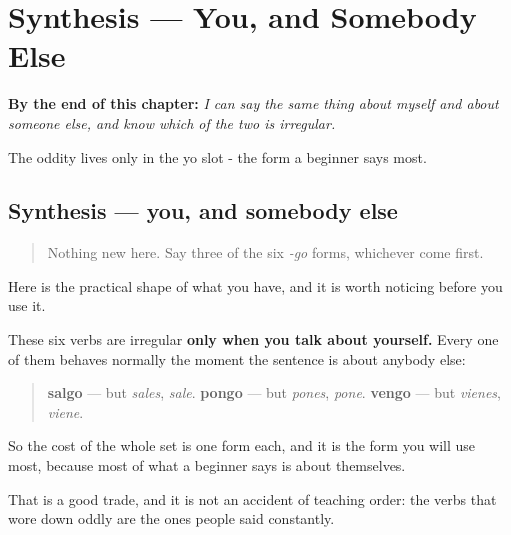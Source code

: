 
\chapter{Synthesis --- You, and Somebody Else}
\label{ch:spanish-synthesis-yo-go}

\begin{chapteropening}
\textbf{By the end of this chapter:} \emph{I can say the same thing about myself and about someone else, and know which of the two is irregular.}

The oddity lives only in the yo slot - the form a beginner says most.
\end{chapteropening}

\section[Practice]{Synthesis — you, and somebody else}

\label{lesson:ES-C13-sintesis-yo-go}



\begin{quote}
Nothing new here. Say three of the six \emph{-go} forms, whichever come first.
\end{quote}

\begin{grammarlens}[title={Grammar Lens: the odd slot is the one about you}]
Here is the practical shape of what you have, and it is worth noticing before you use it.

These six verbs are irregular \textbf{only when you talk about yourself.} Every one of them behaves normally the moment the sentence is about anybody else:

\begin{quote}
\textbf{salgo} — but \emph{sales}, \emph{sale}. \textbf{pongo} — but \emph{pones}, \emph{pone}. \textbf{vengo} — but \emph{vienes}, \emph{viene}.
\end{quote}

So the cost of the whole set is one form each, and it is the form you will use most, because most of what a beginner says is about themselves.

That is a good trade, and it is not an accident of teaching order: the verbs that wore down oddly are the ones people said constantly.
\end{grammarlens}

